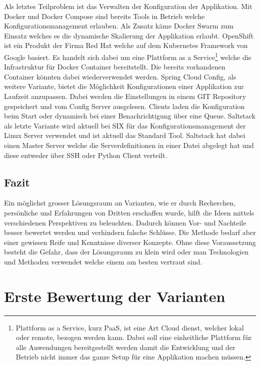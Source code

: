 Als letztes Teilproblem ist das Verwalten der Konfiguration der Applikation. Mit Docker und Docker Compose sind bereits Tools in Betrieb welche Konfigurationsmanagement erlauben. Als Zusatz käme Docker Swarm zum Einsatz welches es die dynamische Skalierung der Applikation erlaubt.\newline
OpenShift ist ein Produkt der Firma Red Hat welche auf dem Kubernetes Framework von Google basiert. Es handelt sich dabei um eine Plattform as a Service\footnote{Plattform as a Service, kurz PaaS, ist eine Art Cloud dienst, welcher lokal oder remote, bezogen werden kann. Dabei soll eine einheitliche Plattform für alle Anwendungen bereitgestellt werden damit die Entwicklung und der Betrieb nicht immer das ganze Setup für eine Applikation machen müssen.} welche die Infrastruktur für Docker Container bereitstellt. Die bereits vorhandenen Container könnten dabei wiederverwendet werden.\newline
Spring Cloud Config, als weitere Variante, bietet die Möglichkeit Konfigurationen einer Applikation zur Laufzeit anzupassen. Dabei werden die Einstellungen in einem GIT Repository gespeichert und vom Config Server ausgelesen. Clients laden die Konfiguration beim Start oder dynamisch bei einer Benachrichtigung über eine Queue.
Saltstack als letzte Variante wird aktuell bei SIX für das Konfigurationsmanagement der Linux Server verwendet und ist aktuell das Standard Tool. Saltstack hat dabei einen Master Server welche die Serverdefinitionen in einer Datei abgelegt hat und diese entweder über SSH oder Python Client verteilt.

\subsection{Fazit}

Ein möglichst grosser Lösungsraum an Varianten, wie er durch Recherchen, persönliche und Erfahrungen von Dritten erschaffen wurde, hilft die Ideen mittels verschiedenen Perspektiven zu beleuchten. Dadurch können Vor- und Nachteile besser bewertet werden und verhindern falsche Schlüsse. Die Methode bedarf aber einer gewissen Reife und Kenntnisse diverser Konzepte. Ohne diese Voraussetzung besteht die Gefahr, dass der Lösungsraum zu klein wird oder man Technologien und Methoden verwendet welche einem am besten vertraut sind.

\section{Erste Bewertung der Varianten}

